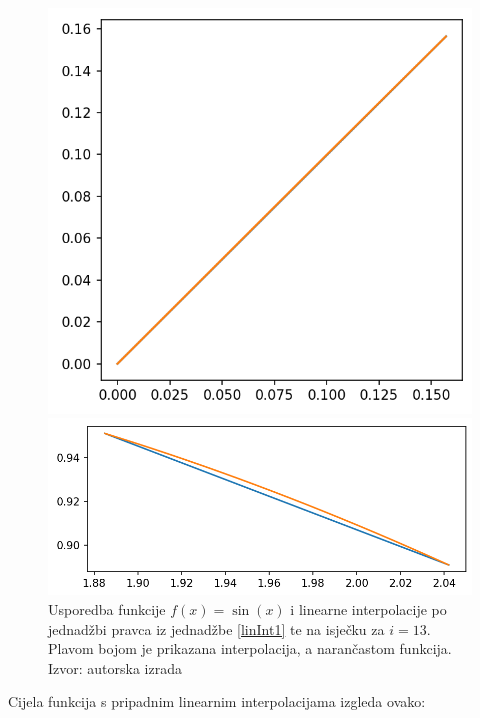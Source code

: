 \documentclass[12pt,a4paper]{report}
\begin{document}
		\begin{figure}[H]
			\centering
			\begin{minipage}{.5\textwidth}
				\centering
				\includegraphics[width=\textwidth]{slike/usporedba40.png}
			\end{minipage}%
			\begin{minipage}{.5\textwidth}
				\centering
				\includegraphics[width=\textwidth]{slike/usporedba412.png}
			\end{minipage}
			\caption{Usporedba funkcije $f(x)=\sin (x)$ i linearne interpolacije po jednadžbi pravca iz jednadžbe \ref{linInt1} te na isječku za $i=13$. Plavom bojom je prikazana interpolacija, a narančastom funkcija. Izvor: autorska izrada}
			\label{linInterSlika1}
		\end{figure}
		Cijela funkcija s pripadnim linearnim interpolacijama izgleda ovako:
\end{document}
